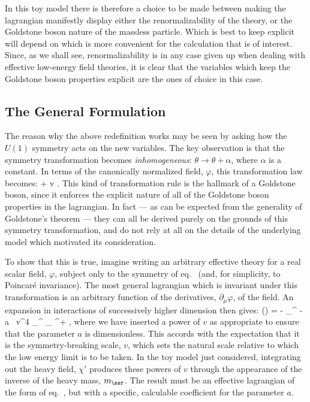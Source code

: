 In this toy model there is therefore a choice to be made
between making the lagrangian manifestly display either the
renormalizability of the theory, or the Goldstone boson
nature of the massless particle. Which is best to keep
explicit will depend on which is more convenient for the
calculation that is of interest. Since, as we shall see,
renormalizability is in any case given up when dealing with
effective low-energy field theories, it is clear that the
variables which keep the Goldstone boson properties
explicit are the ones of choice in this case.

\subsection{The General Formulation}

The reason why the above redefinition works may be seen by
asking how the $U(1)$ symmetry acts on the new variables.
The key observation is that the symmetry  transformation
becomes 
{\em inhomogeneous}: $\theta \to \theta + \alpha$, where 
$\alpha$ is a constant. In terms of the canonically
normalized field, $\varphi$, this transformation law
becomes:
%
\eq
\label{gbabeltransf}
\varphi \to \varphi +  \; v \; \alpha. \eeq
%
This kind of transformation rule is the hallmark of a
Goldstone boson, since it enforces the explicit nature of
all of the Goldstone boson properties in the lagrangian. In
fact --- as can be expected from the generality of
Goldstone's theorem --- they can all be derived purely on
the grounds of this symmetry transformation, and do not
rely at all on the details of the underlying model which
motivated its consideration.

To show that this is true, imagine writing an arbitrary
effective theory for a real scalar field, $\varphi$,
subject only to the symmetry of eq.~
(and, for simplicity, to Poincar\'e invariance).  The most
general lagrangian which is invariant under this
transformation is an arbitrary function of the derivatives,
$\partial_\mu\varphi$, of the field. An expansion in
interactions of successively higher dimension then gives:
%
\eq
\label{abelgbaction}
\leff(\varphi) = - \hf \; \partial_\mu \varphi \partial^\mu
\varphi - {a \, v^4} \;  \partial_\mu \varphi \partial^\mu \varphi \;
\partial_\nu \varphi
\partial^\nu \varphi + \cdots,
\eeq
%
where we have inserted a power of $v$ as appropriate to
ensure that the parameter $a$ is dimensionless. This
accords with the expectation that it is the
symmetry-breaking scale, $v$, which sets the natural scale
relative to which the low energy limit is to be taken. In
the toy model just considered, integrating out the heavy
field, $\chi'$ produces these powers of $v$ through the
appearance of the inverse of the heavy mass, $m_\ssr$. The
result must be an effective lagrangian of the form of 
eq.~, but with a specific, calculable
coefficient for the parameter $a$.

